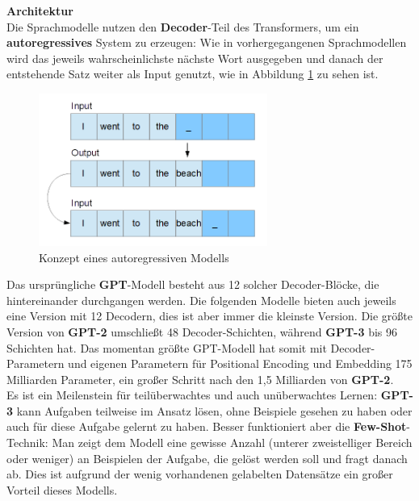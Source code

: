\textbf{Architektur}\\
Die Sprachmodelle nutzen den \textbf{Decoder}-Teil des Transformers, um ein \textbf{autoregressives} System zu erzeugen: Wie in vorhergegangenen Sprachmodellen wird das jeweils wahrscheinlichste n\"achste Wort ausgegeben und danach der entstehende Satz weiter als Input genutzt, wie in Abbildung \ref{fig:autoregressive} zu sehen ist.\\
\begin{figure}[!ht]
\centering
\includegraphics[height=5cm]{pics/autoregressives_modell.png}
\caption{Konzept eines autoregressiven Modells}
\label{fig:autoregressive}
\end{figure}
Das urspr\"ungliche \textbf{GPT}-Modell besteht aus 12 solcher Decoder-Bl\"ocke, die hintereinander durchgangen werden. Die folgenden Modelle bieten auch jeweils eine Version mit 12 Decodern, dies ist aber immer die kleinste Version. Die gr\"o{\ss}te Version von \textbf{GPT-2 } umschlie{\ss}t 48 Decoder-Schichten, w\"ahrend \textbf{GPT-3} bis 96 Schichten hat. Das momentan gr\"o{\ss}te GPT-Modell hat somit mit Decoder-Parametern und eigenen Parametern f\"ur Positional Encoding und Embedding 175 Milliarden Parameter, ein gro{\ss}er Schritt nach den 1,5 Milliarden von \textbf{GPT-2}.\\
 Es ist ein Meilenstein f\"ur teil\"uberwachtes und auch un\"uberwachtes Lernen: \textbf{GPT-3} kann Aufgaben teilweise im Ansatz l\"osen, ohne Beispiele gesehen zu haben oder auch f\"ur diese Aufgabe gelernt zu haben. Besser funktioniert aber die \textbf{Few-Shot}-Technik: Man zeigt dem Modell eine gewisse Anzahl (unterer zweistelliger Bereich oder weniger) an Beispielen der Aufgabe, die gel\"ost werden soll und fragt danach ab. Dies ist aufgrund der wenig vorhandenen gelabelten Datens\"atze ein gro{\ss}er Vorteil dieses Modells.\\

